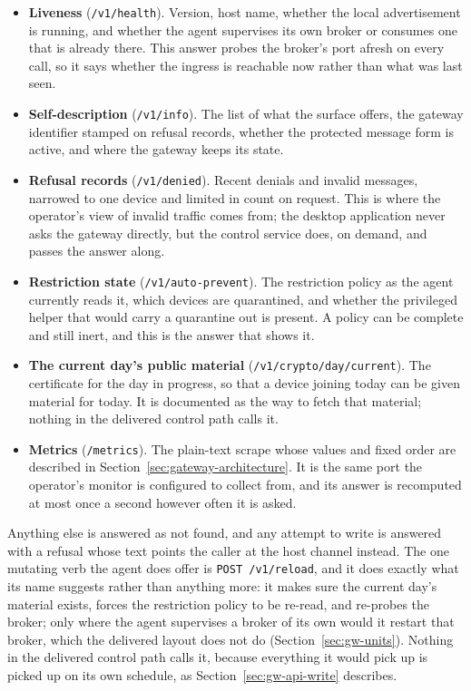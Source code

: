 \documentclass[12pt,a4paper]{report}
\begin{document}
\begin{itemize}
    \item \textbf{Liveness} (\texttt{/v1/health}).
    Version, host name, whether the local advertisement is running, and
    whether the agent supervises its own broker or consumes one that is
    already there. This answer probes the broker's port afresh on every
    call, so it says whether the ingress is reachable now rather than
    what was last seen.
    \item \textbf{Self-description} (\texttt{/v1/info}).
    The list of what the surface offers, the gateway identifier stamped
    on refusal records, whether the protected message form is active,
    and where the gateway keeps its state.
    \item \textbf{Refusal records} (\texttt{/v1/denied}).
    Recent denials and invalid messages, narrowed to one device and
    limited in count on request. This is where the operator's view of
    invalid traffic comes from; the desktop application never asks the
    gateway directly, but the control service does, on demand, and
    passes the answer along.
    \item \textbf{Restriction state} (\texttt{/v1/auto-prevent}).
    The restriction policy as the agent currently reads it, which
    devices are quarantined, and whether the privileged helper that
    would carry a quarantine out is present. A policy can be complete
    and still inert, and this is the answer that shows it.
    \item \textbf{The current day's public material}
    (\texttt{/v1/crypto/day/current}).
    The certificate for the day in progress, so that a device joining
    today can be given material for today. It is documented as the way
    to fetch that material; nothing in the delivered control path calls
    it.
    \item \textbf{Metrics} (\texttt{/metrics}).
    The plain-text scrape whose values and fixed order are described in
    Section~\ref{sec:gateway-architecture}. It is the same port the
    operator's monitor is configured to collect from, and its answer is
    recomputed at most once a second however often it is asked.
\end{itemize}

Anything else is answered as not found, and any attempt to write is
answered with a refusal whose text points the caller at the host
channel instead. The one mutating verb the agent does offer is
\texttt{POST /v1/reload}, and it does exactly what its name suggests
rather than anything more: it makes sure the current day's material
exists, forces the restriction policy to be re-read, and re-probes the
broker; only where the agent supervises a broker of its own would it
restart that broker, which the delivered layout does not do
(Section~\ref{sec:gw-units}). Nothing in the delivered control path
calls it, because everything it would pick up is picked up on its own
schedule, as Section~\ref{sec:gw-api-write} describes.
\end{document}
